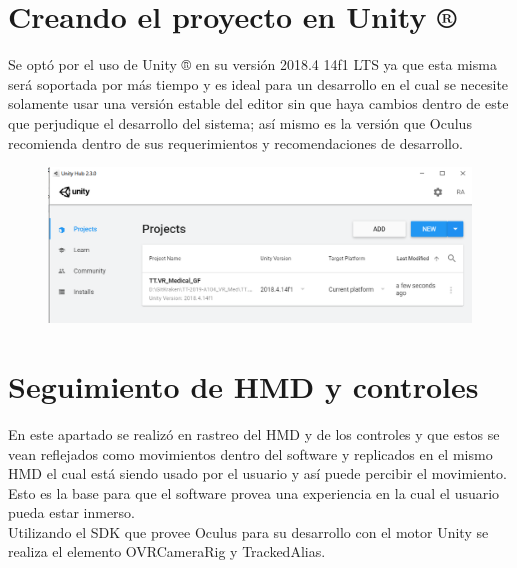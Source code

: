 \section{Creando el proyecto en Unity ®}
Se optó por el uso de Unity ® en su versión 2018.4 14f1 LTS  ya que esta misma será soportada por más tiempo y es ideal para un desarrollo en el cual se necesite solamente usar una versión estable del editor sin que haya cambios dentro de este que perjudique el desarrollo del sistema; así mismo es la versión que Oculus\cite{web15} recomienda dentro de sus requerimientos y recomendaciones de desarrollo.\\
\begin{figure}[H]
	\begin{center}
 		\includegraphics[width = 1\textwidth]{source/images/image51.png}
	\end{center} 
\end{figure}

\section{Seguimiento de HMD y controles}
En este apartado se realizó en rastreo del HMD y de los controles y que estos se vean reflejados como movimientos dentro del software y replicados en el mismo HMD el cual está siendo usado por el usuario y así puede percibir el movimiento. Esto es la base para que el software provea una experiencia en la cual el usuario pueda estar inmerso.\\

Utilizando el SDK que provee Oculus para su desarrollo con el motor Unity se realiza el elemento OVRCameraRig y TrackedAlias.\\


